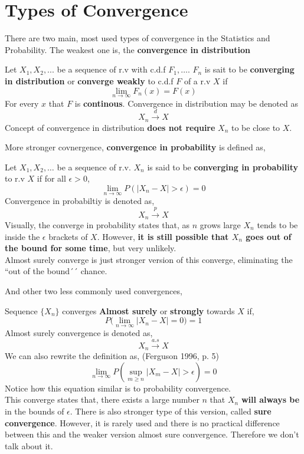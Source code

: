 \section{Types of Convergence}
There are two main, most used types of convergence in the Statistics and Probability. The weakest one is, the \textbf{convergence in distribution}
\begin{definition}
    Let $X_1,X_2, ...$ be a sequence of r.v  with c.d.f $F_1, \ldots $. $F_n$ is sait to be \textbf{converging in distribution} or \textbf{converge weakly} to c.d.f $F$ of a r.v $X$ if
    \[ \lim_{n \rightarrow \infty} F_n(x) = F(x)\]
    For every $x$ that  $F$ is \textbf{continous}. Convergence in distribution may be denoted as 
    \[ X_n \stackrel{d}{\rightarrow} X \]
    Concept of convergence in distribution \textbf{does not require} $X_n$ to be close to $X$. \\
\end{definition}
More stronger covnergence, \textbf{convergence in probability} is defined as,
\begin{definition}
    Let $X_1,X_2, \ldots $ be a sequence of r.v. $X_n$ is said to be \textbf{converging in probability} to r.v $X$ if for all $\epsilon > 0$,
    \[ \lim_{n \rightarrow \infty} P(|X_n - X| > \epsilon) = 0 \]
    Convergence in probabiltiy is denoted as, 
    \[ X_n \stackrel{p}{\rightarrow} X\]
    Visually, the converge in probability states that, as $n$ grows large $X_n$ tends to be inside the $\epsilon$ brackets of $X$. However, \textbf{it is still possible that $X_n$ goes out of the bound for some time}, but very unlikely. \\
    Almost surely converge is just stronger version of this converge, eliminating the ``out of the bound´´ chance.
\end{definition}
And other two less commonly used convergences,
\begin{definition}
    Sequence $\{ X_n \}$  converges \textbf{Almost surely} or \textbf{strongly} towards $X$ if,
    \[ P \biggl( \lim_{n \rightarrow \infty}|X_n - X | = 0 \biggr) = 1\]
    Almost surely convergence is denoted as, 
    \[ X_n \stackrel{a.s}{\rightarrow} X\]
    We can also rewrite the definition as, (Ferguson 1996, p. 5)
    \[ \lim_{n\to\infty} P\left({\sup_{m\geq n}|X_m-X|>\epsilon }\right) = 0\]
Notice how this equation similar is to probability convergence.\\
This converge states that, there exists a large number $n$ that $X_n$ \textbf{will always be} in the bounds of $\epsilon$.
There is also stronger type of this version, called \textbf{sure convergence}. However, it is rarely used and there is no practical difference between this and the weaker version almost sure convergence. Therefore we don't talk about it.\\
\end{definition}
